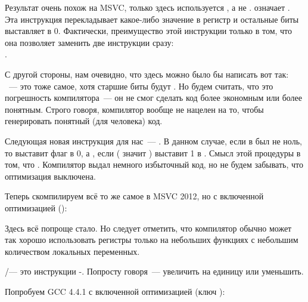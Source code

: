 \label{movzx}
Результат очень похож на MSVC, только здесь используется \MOVZX, а не \MOVSX. 
\MOVZX означает . Эта инструкция перекладывает какое-либо значение 
в регистр и остальные биты выставляет в 0.
Фактически, преимущество этой инструкции только в том, что она позволяет 
заменить две инструкции сразу:\\
.

С другой стороны, нам очевидно, что здесь можно было бы написать вот так: \\
~--- это тоже самое, хотя старшие биты \EAX будут . 
Но будем считать, что это погрешность компилятора~--- 
он не смог сделать код более экономным или более понятным. 
Строго говоря, компилятор вообще не нацелен на то, чтобы генерировать понятный (для человека) код.

Следующая новая инструкция для нас~--- \SETNZ. В данном случае, если в \AL был не ноль, 
то  выставит флаг \ZF в 0, а \SETNZ, если  
( значит ) выставит 1 в \AL. 
Смысл этой процедуры в том, что 
 .
Компилятор выдал немного избыточный код, но не будем забывать, что оптимизация выключена.

\label{strlen_MSVC_Ox}

Теперь скомпилируем всё то же самое в MSVC 2012, но с включенной оптимизацией (\Ox):



Здесь всё попроще стало. Но следует отметить, что компилятор обычно может так хорошо использовать регистры 
только на небольших функциях с небольшим количеством локальных переменных.

\INC/\DEC --- это инструкции -. Попросту говоря~--- 
увеличить на единицу или уменьшить.




Попробуем GCC 4.4.1 с включенной оптимизацией (ключ \Othree):



